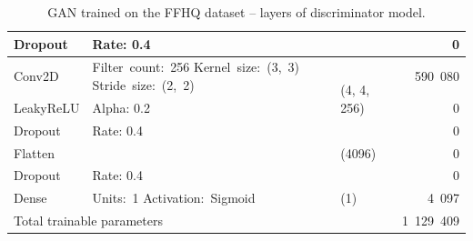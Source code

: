 \begin{table}
\begin{center}
\begin{tabular}{ |m{5em}|m{9em}|l|r| }
            \cline{1-2} \cline{4-4}
                Dropout & Rate: 0.4 & & 0 \\
             \hline
                Conv2D & \mbox{Filter count: 256} \mbox{Kernel size: (3, 3)} \mbox{Stride size: (2, 2)} & \multirow{3}{6em}{(4, 4, 256)} & 590~080 \\
            \cline{1-2} \cline{4-4}
                LeakyReLU & Alpha: 0.2 & & 0 \\
            \cline{1-2} \cline{4-4}
                Dropout & Rate: 0.4 & & 0 \\
            \hline
                Flatten & & (4096) & 0 \\
            \hline
                Dropout & Rate: 0.4 & & 0 \\
            \hline
                Dense & \mbox{Units: 1} \mbox{Activation: Sigmoid} & (1) & 4~097 \\
            \hline
            \hline
                \multicolumn{3}{|l|}{Total trainable parameters} & 1~129~409 \\
            \hline
        \end{tabular}
    \end{center}
    \caption{\label{tab:gan-ffhq-discriminator}GAN trained on the FFHQ dataset – layers of discriminator model.}
\end{table}

